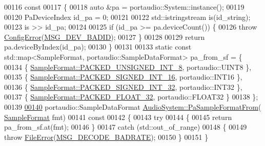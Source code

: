 \begin{DoxyCode}
00116 \textcolor{keyword}{                const}
00117 \textcolor{keyword}{}\{
00118     \textcolor{keyword}{auto} &pa = portaudio::System::instance();
00119 
00120     PaDeviceIndex id\_pa = 0;
00121 
00122     std::istringstream is(id\_string);
00123     is >> id\_pa;
00124 
00125     \textcolor{keywordflow}{if} (id\_pa >= pa.deviceCount()) \{
00126         \textcolor{keywordflow}{throw} \hyperlink{classConfigError}{ConfigError}(\hyperlink{messages_8h_a80a8cb0d00a63114c8c5c8228fa39ec4}{MSG\_DEV\_BADID});
00127     \}
00128 
00129     \textcolor{keywordflow}{return} pa.deviceByIndex(id\_pa);
00130 \}
00131 
00133 \textcolor{keyword}{static} \textcolor{keyword}{const} std::map<SampleFormat, portaudio::SampleDataFormat> pa\_from\_sf = \{
00134     \{ \hyperlink{sample__formats_8hpp_a21cca244e782ff3acc8805fb73236772a0f083be5e0e503eb0830e26687f00cf2}{SampleFormat::PACKED\_UNSIGNED\_INT\_8}, portaudio::UINT8 \},
00135     \{ \hyperlink{sample__formats_8hpp_a21cca244e782ff3acc8805fb73236772a3bc6c5371607364846832278d3d39965}{SampleFormat::PACKED\_SIGNED\_INT\_16}, portaudio::INT16 \},
00136     \{ \hyperlink{sample__formats_8hpp_a21cca244e782ff3acc8805fb73236772ae222eded89afdf8cf763bb1a58a04fc0}{SampleFormat::PACKED\_SIGNED\_INT\_32}, portaudio::INT32 \},
00137     \{ \hyperlink{sample__formats_8hpp_a21cca244e782ff3acc8805fb73236772ae58d6feb65720ac0b7e1158a2debcf7d}{SampleFormat::PACKED\_FLOAT\_32}, portaudio::FLOAT32 \}
00138 \};
00139 
\hypertarget{audio__system_8cpp_source_l00140}{}\hyperlink{classAudioSystem_aac640b14ad80c2518539bcafe9f4b5ac}{00140} portaudio::SampleDataFormat \hyperlink{classAudioSystem_aac640b14ad80c2518539bcafe9f4b5ac}{AudioSystem::PaSampleFormatFrom}(
      \hyperlink{sample__formats_8hpp_a21cca244e782ff3acc8805fb73236772}{SampleFormat} fmt)\textcolor{keyword}{}
00141 \textcolor{keyword}{                const}
00142 \textcolor{keyword}{}\{
00143     \textcolor{keywordflow}{try}
00144     \{
00145         \textcolor{keywordflow}{return} pa\_from\_sf.at(fmt);
00146     \}
00147     \textcolor{keywordflow}{catch} (std::out\_of\_range)
00148     \{
00149         \textcolor{keywordflow}{throw} \hyperlink{classFileError}{FileError}(\hyperlink{messages_8h_a6d4302117e822520f5c61b6d40085c4d}{MSG\_DECODE\_BADRATE});
00150     \}
00151 \}
\end{DoxyCode}

